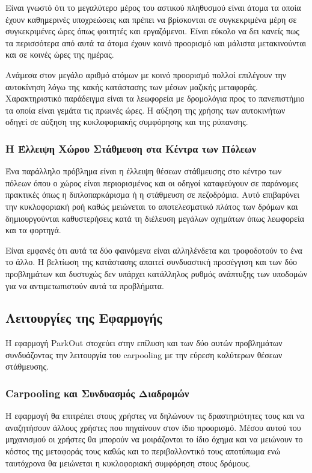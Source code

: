 \documentclass[11pt]{article}
\begin{document}
Είναι γνωστό ότι το μεγαλύτερο μέρος του αστικού πληθυσμού είναι άτομα τα
οποία έχουν καθημερινές υποχρεώσεις και πρέπει να βρίσκονται
σε συγκεκριμένα μέρη σε συγκεκριμένες ώρες όπως φοιτητές και εργαζόμενοι.
Είναι εύκολο να δει κανείς πως τα περισσότερα από αυτά τα άτομα
έχουν κοινό προορισμό και μάλιστα μετακινούνται και σε κοινές ώρες της
ημέρας.

Ανάμεσα στον μεγάλο αριθμό ατόμων με κοινό προορισμό πολλοί επιλέγουν
την αυτοκίνηση λόγω της κακής κατάστασης των μέσων μαζικής μεταφοράς.
Χαρακτηριστικό παράδειγμα είναι τα λεωφορεία με δρομολόγια προς το
πανεπιστήμιο τα οποία είναι γεμάτα τις πρωινές ώρες.
Η αύξηση της χρήσης των αυτοκινήτων οδηγεί σε αύξηση της
κυκλοφοριακής συμφόρησης και της ρύπανσης.

\subsubsection{Η Έλλειψη Χώρου Στάθμευση στα Κέντρα των Πόλεων}

Ένα παράλληλο πρόβλημα είναι η έλλειψη θέσεων στάθμευσης στο κέντρο
των πόλεων όπου ο χώρος είναι περιορισμένος και οι οδηγοί καταφεύγουν
σε παράνομες πρακτικές όπως η διπλοπαρκάρισμα ή η στάθμευση σε
πεζοδρόμια. Αυτό επιβαρύνει την κυκλοφοριακή ροή καθώς μειώνεται
το αποτελεσματικό πλάτος των δρόμων και δημιουργούνται καθυστερήσεις
κατά τη διέλευση μεγάλων οχημάτων όπως λεωφορεία και τα φορτηγά.

Είναι εμφανές ότι αυτά τα δύο φαινόμενα είναι αλληλένδετα και
τροφοδοτούν το ένα το άλλο. Η βελτίωση της κατάστασης απαιτεί
συνδυαστική προσέγγιση και των δύο προβλημάτων και δυστυχώς δεν
υπάρχει κατάλληλος ρυθμός ανάπτυξης των υποδομών για να
αντιμετωπιστούν αυτά τα προβλήματα.

\subsection{Λειτουργίες της Εφαρμογής}

Η εφαρμογή ParkOut στοχεύει στην επίλυση
και των δύο αυτών προβλημάτων συνδυάζοντας την λειτουργία του carpooling
με την εύρεση καλύτερων θέσεων στάθμευσης.

\subsubsection{Carpooling και Συνδυασμός Διαδρομών}

Η εφαρμογή θα επιτρέπει στους χρήστες να δηλώνουν τις δραστηριότητες τους
και να αναζητήσουν άλλους χρήστες που πηγαίνουν στον ίδιο προορισμό.
Μέσου αυτού του μηχανισμού οι χρήστες θα μπορούν να μοιράζονται το
ίδιο όχημα και να μειώνουν το κόστος της μεταφοράς τους καθώς και το
περιβαλλοντικό τους αποτύπωμα ενώ ταυτόχρονα θα μειώνεται η κυκλοφοριακή
συμφόρηση στους δρόμους.
\end{document}

